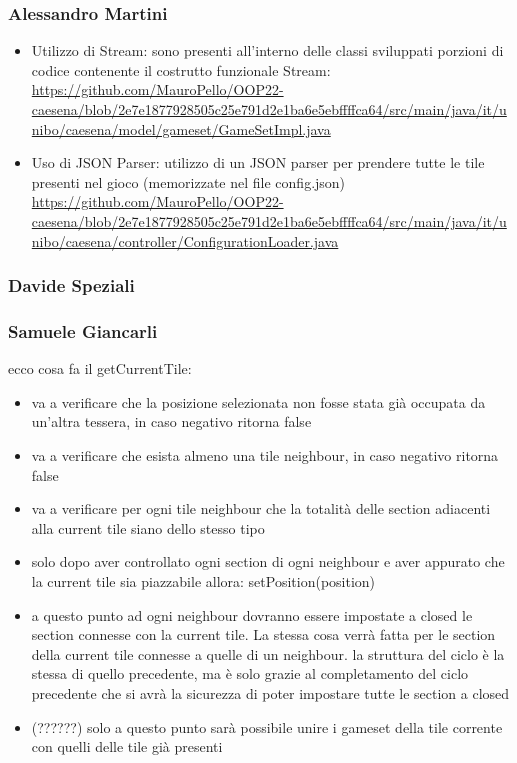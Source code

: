 \subsubsection*{Alessandro Martini}
\begin{itemize}
    \item Utilizzo di Stream: sono presenti all'interno delle classi sviluppati porzioni di codice contenente il costrutto funzionale Stream: \url{https://github.com/MauroPello/OOP22-caesena/blob/2e7e1877928505c25e791d2e1ba6e5ebffffca64/src/main/java/it/unibo/caesena/model/gameset/GameSetImpl.java}
    \item Uso di JSON Parser: utilizzo di un JSON parser per prendere tutte le tile presenti nel gioco (memorizzate nel file config.json) \url{https://github.com/MauroPello/OOP22-caesena/blob/2e7e1877928505c25e791d2e1ba6e5ebffffca64/src/main/java/it/unibo/caesena/controller/ConfigurationLoader.java}
\end{itemize}

\subsubsection*{Davide Speziali}

\subsubsection*{Samuele Giancarli}
ecco cosa fa il getCurrentTile:

\begin{itemize}
\item va a verificare che la posizione selezionata non fosse stata già occupata da un’altra tessera, in caso negativo ritorna false
\item va a verificare che esista almeno una tile neighbour, in caso negativo ritorna false
\item va a verificare per ogni tile neighbour che la totalità delle section adiacenti alla current tile siano dello stesso tipo
\item solo dopo aver controllato ogni section di ogni neighbour e aver appurato che la current tile sia piazzabile allora: setPosition(position)
\item a questo punto ad ogni neighbour dovranno essere impostate a closed le section connesse con la current tile. La stessa cosa verrà fatta per le section della current tile connesse a quelle di un neighbour.
\subitem la struttura del ciclo è la stessa di quello precedente, ma è solo grazie al completamento del ciclo precedente che si avrà la sicurezza di poter impostare tutte le section a closed 
\item (??????) solo a questo punto sarà possibile unire i gameset della tile corrente con quelli delle tile già presenti
\end{itemize}